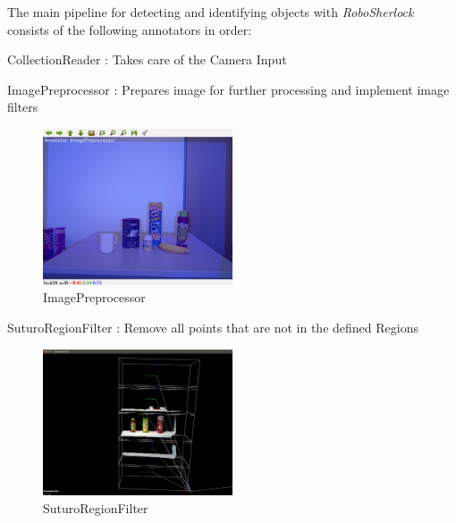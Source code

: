 \documentclass[main.tex]{subfiles}
\begin{document}
The main pipeline for detecting and identifying objects with \textit{RoboSherlock} consists of the following annotators in order:  
\begin{itemize}
	\item CollectionReader : Takes care of the Camera  Input

	\begin{minipage}[t]{\textwidth}
	\item ImagePreprocessor : Prepares image for further processing and implement image filters
		\begin{figure}[H]
   			 \centering
    			\includegraphics[width=0.5\textwidth]{pictures/2d/ImagePreProcessor.png}
   			 \caption{ImagePreprocessor}
  		\end{figure}
	\end{minipage}

	\begin{minipage}[t]{\textwidth}
	\item SuturoRegionFilter : Remove all points that are not in the defined Regions 
		\begin{figure}[H]
   			 \centering
    			\includegraphics[width=0.5\textwidth]{pictures/pcl/RegionFilter.png}
   			 \caption{SuturoRegionFilter}
  		\end{figure}
	\end{minipage}


\end{itemize}
\end{document}

